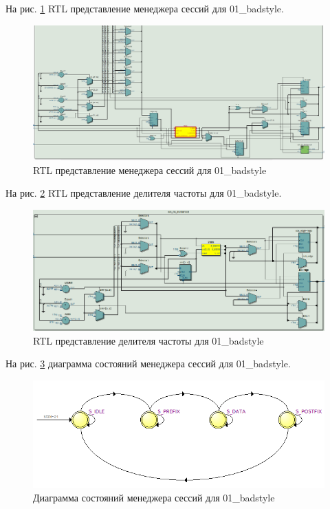 \documentclass[a4paper,14pt]{article}
\begin{document}
	На рис. \ref{fig:z15rtl} RTL представление менеджера сессий для 01\_badstyle.
	
	\begin{figure}[H]
		\centering
		\includegraphics[width=0.9\linewidth]{images/z1_5_rtl}
		\caption{RTL представление менеджера сессий для 01\_badstyle}
		\label{fig:z15rtl}
	\end{figure}

	На рис. \ref{fig:z15rtlclkdivider} RTL представление делителя частоты для 01\_badstyle.
	
	\begin{figure}[H]
		\centering
		\includegraphics[width=0.9\linewidth]{images/z1_5_rtl_clk_divider}
		\caption{RTL представление делителя частоты для 01\_badstyle}
		\label{fig:z15rtlclkdivider}
	\end{figure}

	На рис. \ref{fig:z15auto} диаграмма состояний менеджера сессий для 01\_badstyle.
	
	\begin{figure}[H]
		\centering
		\includegraphics[width=0.6\linewidth]{images/z1_5_auto}
		\caption{Диаграмма состояний менеджера сессий для 01\_badstyle}
		\label{fig:z15auto}
	\end{figure}
	
\end{document}
